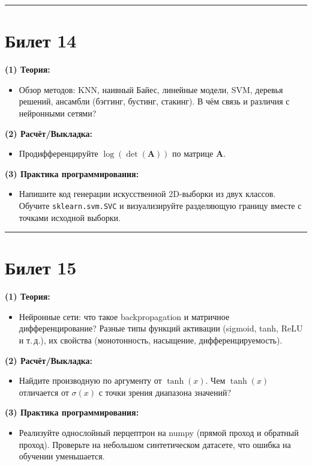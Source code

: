 \documentclass[a4paper,12pt]{article}
\begin{document}
\noindent\rule{\textwidth}{0.4pt}
\newpage

\section*{Билет 14}
\textbf{(1) Теория:}
\begin{itemize}
  \item Обзор методов: KNN, наивный Байес, линейные модели, SVM, деревья решений, ансамбли (бэггинг, бустинг, стакинг). В чём связь и различия с нейронными сетями?
\end{itemize}

\textbf{(2) Расчёт/Выкладка:}
\begin{itemize}
  \item Продифференцируйте $\log(\det(\mathbf{A}))$ по матрице $\mathbf{A}$.
\end{itemize}

\textbf{(3) Практика программирования:}
\begin{itemize}
  \item Напишите код генерации искусственной 2D-выборки из двух классов. Обучите \texttt{sklearn.svm.SVC} и визуализируйте разделяющую границу вместе с точками исходной выборки.
\end{itemize}

\noindent\rule{\textwidth}{0.4pt}
\newpage

\section*{Билет 15}
\textbf{(1) Теория:}
\begin{itemize}
  \item Нейронные сети: что такое backpropagation и матричное дифференцирование? Разные типы функций активации (sigmoid, tanh, ReLU и т.\,д.), их свойства (монотонность, насыщение, дифференцируемость).
\end{itemize}

\textbf{(2) Расчёт/Выкладка:}
\begin{itemize}
  \item Найдите производную по аргументу от $\tanh(x)$. Чем $\tanh(x)$ отличается от $\sigma(x)$ с точки зрения диапазона значений?
\end{itemize}

\textbf{(3) Практика программирования:}
\begin{itemize}
  \item Реализуйте однослойный перцептрон на numpy (прямой проход и обратный проход). Проверьте на небольшом синтетическом датасете, что ошибка на обучении уменьшается.
\end{itemize}
\end{document}
